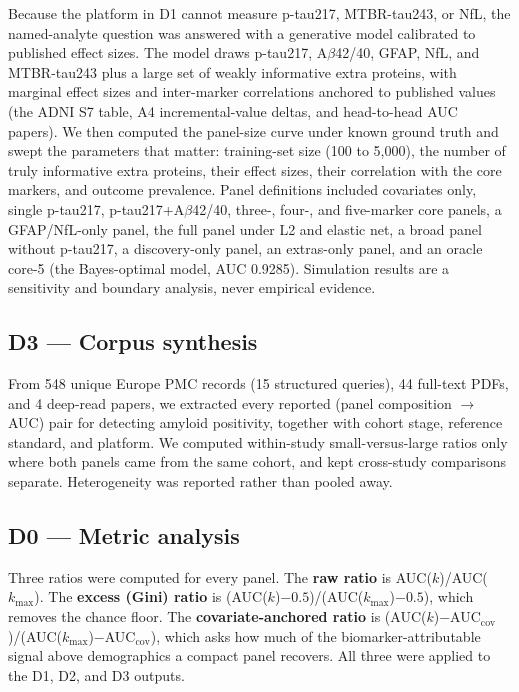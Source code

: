\documentclass{article}
\begin{document}
Because the platform in D1 cannot measure p-tau217, MTBR-tau243, or NfL, the
named-analyte question was answered with a generative model calibrated to
published effect sizes. The model draws p-tau217, A$\beta$42/40, GFAP, NfL, and
MTBR-tau243 plus a large set of weakly informative extra proteins, with
marginal effect sizes and inter-marker correlations anchored to published
values (the ADNI S7 table, A4 incremental-value deltas, and head-to-head AUC
papers). We then computed the panel-size curve under known ground truth and
swept the parameters that matter: training-set size (100 to 5{,}000), the
number of truly informative extra proteins, their effect sizes, their
correlation with the core markers, and outcome prevalence. Panel definitions
included covariates only, single p-tau217, p-tau217+A$\beta$42/40, three-,
four-, and five-marker core panels, a GFAP/NfL-only panel, the full panel under
L2 and elastic net, a broad panel without p-tau217, a discovery-only panel, an
extras-only panel, and an oracle core-5 (the Bayes-optimal model, AUC 0.9285).
Simulation results are a sensitivity and boundary analysis, never empirical
evidence.

\subsection{D3 --- Corpus synthesis}

From 548 unique Europe PMC records (15 structured queries), 44 full-text PDFs,
and 4 deep-read papers, we extracted every reported (panel composition
$\rightarrow$ AUC) pair for detecting amyloid positivity, together with cohort
stage, reference standard, and platform. We computed within-study
small-versus-large ratios only where both panels came from the same cohort, and
kept cross-study comparisons separate. Heterogeneity was reported rather than
pooled away.

\subsection{D0 --- Metric analysis}

Three ratios were computed for every panel. The \textbf{raw ratio} is
AUC($k$)/AUC($k_{\max}$). The \textbf{excess (Gini) ratio} is
(AUC($k$)$-0.5$)/(AUC($k_{\max}$)$-0.5$), which removes the chance floor. The
\textbf{covariate-anchored ratio} is
(AUC($k$)$-$AUC$_{\mathrm{cov}}$)/(AUC($k_{\max}$)$-$AUC$_{\mathrm{cov}}$),
which asks how much of the biomarker-attributable signal above demographics a
compact panel recovers. All three were applied to the D1, D2, and D3 outputs.
\end{document}
